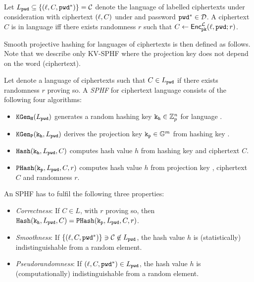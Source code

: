 
\begin{definition}\label{def:language}
Let $L_\mathtt{pwd} \subseteq \{(\ell, C, \mathtt{pwd}^\ast)\}=\mathcal{C}$ denote the language of labelled ciphertexts under consideration with ciphertext $(\ell,C)$ under \pk and password $\mathtt{pwd}^\ast\in\mathcal{D}$.
A ciphertext $C$ is in language \Lpwd iff there exists randomness $r$ such that $C\gets\mathsf{Enc}^{\mathcal{L}}_\mathtt{pk}(\ell,\mathtt{pwd};r)$.
\end{definition}

\noindent
Smooth projective hashing for languages of ciphertexts is then defined as follows.
Note that we describe only KV-SPHF where the projection key does not depend on the word (ciphertext).

\begin{definition}[KV-SPHF]\label{def:sphf}
Let \Lpwd denote a language of ciphertexts such that $C\in L_\mathtt{pwd}$ if there exists randomness $r$ proving so.
A \emph{\acl{SPHF}} for ciphertext language \Lpwd consists of the following four algorithms:

\begin{itemize}
	\item $\mathtt{KGen_H}(L_\mathtt{pwd})$ generates a random hashing key $\mathtt{k_h}\in\mathbb{Z}_p^n$ for language \Lpwd.
	\item $\mathtt{KGen_P}(\mathtt{k_h},L_\mathtt{pwd})$ derives the projection key $\mathtt{k_p}\in\mathbb{G}^m$ from hashing key \hk. 
	\item $\mathtt{Hash}(\mathtt{k_h},L_\mathtt{pwd},C)$ computes hash value $h$ from hashing key \hk and ciphertext $C$.
	\item $\mathtt{PHash}(\mathtt{k_p},L_\mathtt{pwd},C,r)$ computes hash value $h$ from projection key \hp, ciphertext $C$ and randomness $r$. 
\end{itemize}
\end{definition}

\noindent
An \ac{SPHF} has to fulfil the following three properties:
\begin{itemize}
	\item \emph{Correctness}: If $C\in L$, with $r$ proving so, then $\mathtt{Hash}(\mathtt{k_h},L_\mathtt{pwd},C)=\mathtt{PHash}(\mathtt{k_p},L_\mathtt{pwd},C,r)$.
	\item \emph{Smoothness}: If $\{(\ell, C, \mathtt{pwd}^\ast)\}\ni \mathcal{C}\not\in L_\mathtt{pwd}$, the hash value $h$ is (statistically) indistinguishable from a random element. 
	\item \emph{Pseudorandomness}: If $(\ell, C, \mathtt{pwd}^\ast)\in L_\mathtt{pwd}$, the hash value $h$ is (computationally) indistinguishable from a random element. 
\end{itemize}

